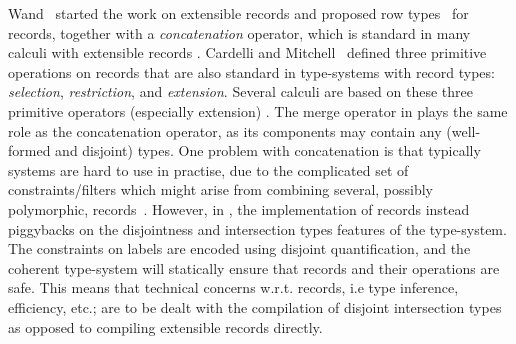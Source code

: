 Wand~\cite{wand1987complete} started the work on extensible records and proposed
row types~\cite{wand1989type} for records, together with a \emph{concatenation}
operator, which is standard in many calculi with extensible records
\cite{harper1991record,remy1992typing,wand1989type,sulzmann97designing,makholm05type,pottier2003constraint}.
Cardelli and Mitchell~\cite{cardelli1990operations} defined three primitive operations on
records that are also standard in type-systems with record types: 
\emph{selection}, \emph{restriction}, and \emph{extension}. 
Several calculi are based on these three primitive operators (especially extension)
\cite{remy1993type,gaster1996polymorphic,jones99lightweight,leijen2004first,leijen2005extensible,blume2006extensible}.
The merge operator in \name plays the same role as the concatenation operator, as its components 
may contain any (well-formed and disjoint) types.
One problem with concatenation is that typically systems are hard to use in practise, due to the
complicated set of constraints/filters which might arise from combining several, possibly 
polymorphic, records~\cite{leijen2005extensible}.
However, in \name, the implementation of records instead piggybacks on the disjointness
and intersection types features of the type-system.
The constraints on labels are encoded using disjoint quantification, and the coherent
type-system will statically ensure that records and their operations are safe.
This means that technical concerns w.r.t. records, i.e type inference, efficiency, etc.; are to be dealt with the 
compilation of disjoint intersection types as opposed to compiling
extensible records directly.

